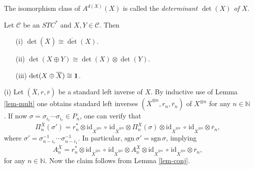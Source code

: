 \documentclass[11pt]{article}
\theoremstyle{definition}
\theoremstyle{definition}
\theoremstyle{remark}
\def\2#1{{\mathcal #1}}
\def\7#1{{\mathbb #1}}
\def\1#1{{\bf #1}}
\def\ol#1{{\overline #1}}
\newcommand{\mcirc}{\,\circ\,}
\def\id{\mathrm{id}}
\begin{document}
\bdefin {}
The isomorphism class of $A^{d(X)}(X)$ is called the {\it determinant $\det(X)$ of $X$}. 
\edefin

\blemma \label{l-dets}
Let $\2C$ be an $STC^*$ and $X,Y\in\2C$. Then 
\begin{itemize}
\item[(i)] $\det(\ol{X})\cong \ol{\det(X)}$.
\item[(ii)] $\det(X\oplus Y)\cong \det(X)\otimes \det(Y)$.
\item[(iii)] $\det(X\oplus \ol{X})\cong\11$.
\end{itemize}
\elemma

\prf (i) Let $(\ol{X},r,\ol{r})$ be a standard left inverse of $X$. By inductive use of Lemma
\ref{lem-mult} one obtains standard left inverses $(\ol{X}^{\otimes n},r_n,\ol{r}_n)$ of
$X^{\otimes n}$ for any $n\in\7N$. If now $\sigma=\sigma_{i_1}\cdots\sigma_{i_r}\in P_n$, one can
verify that
\[ \Pi_n^{\ol{X}}(\sigma')=r_n^*\otimes\id_{\ol{X}^{\otimes n}}
  \mcirc\id_{\ol{X}^{\otimes n}}\otimes\Pi_n^X(\sigma)\otimes\id_{\ol{X}^{\otimes n}}
  \mcirc\id_{\ol{X}^{\otimes n}}\otimes\ol{r}_n, \]
where $\sigma'=\sigma_{n-i_r}^{-1}\cdots\sigma_{n-i_1}^{-1}$. In particular,
$\mathrm{sgn}\,\sigma'=\mathrm{sgn}\,\sigma$, implying
\[ A_n^{\ol{X}}=r_n^*\otimes\id_{\ol{X}^{\otimes n}}
  \mcirc\id_{\ol{X}^{\otimes n}}\otimes A_n^X\otimes\id_{\ol{X}^{\otimes n}}
  \mcirc\id_{\ol{X}^{\otimes n}}\otimes\ol{r}_n, \]
for any $n\in\7N$. Now the claim follows from Lemma \ref{lem-conj}.
\end{document}
